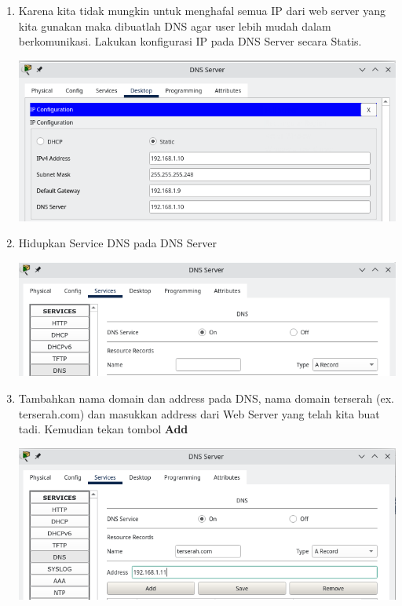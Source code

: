 \documentclass{article}
\begin{document}
\begin{flushleft}
\begin{enumerate}
            \item Karena kita tidak mungkin untuk menghafal semua IP dari web server yang kita gunakan maka dibuatlah DNS agar user lebih mudah dalam berkomunikasi. Lakukan konfigurasi IP pada DNS Server secara Statis.
            
            \begin{center}
                \includegraphics[scale=0.6]{3-8.png}
            \end{center}

            \item Hidupkan Service DNS pada DNS Server
            
            \begin{center}
                \includegraphics[scale=0.6]{3-9.png}
            \end{center}

            \item Tambahkan nama domain dan address pada DNS, nama domain terserah (ex. terserah.com) dan masukkan address dari Web Server yang telah kita buat tadi. Kemudian tekan tombol \textbf{Add}
            
            \begin{center}
                \includegraphics[scale=0.6]{3-10.png}
            \end{center}


\end{enumerate}
\end{flushleft}
\end{document}
